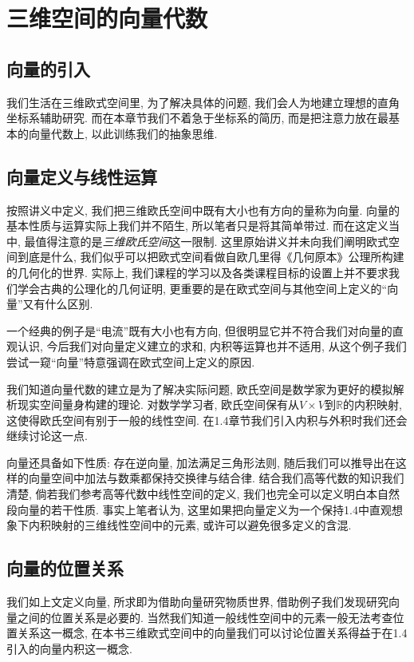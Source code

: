 \documentclass[./main.tex]{subfiles}
\begin{document}
\chapter{三维空间的向量代数}

\section{向量的引入}

我们生活在三维欧式空间里, 为了解决具体的问题, 我们会人为地建立理想的直角坐标系辅助研究. 而在本章节我们不着急于坐标系的简历, 而是把注意力放在最基本的向量代数上, 以此训练我们的抽象思维. 

\section{向量定义与线性运算}

按照讲义中定义, 我们把三维欧氏空间中既有大小也有方向的量称为向量. 向量的基本性质与运算实际上我们并不陌生, 所以笔者只是将其简单带过. 而在这定义当中, 最值得注意的是\textit{三维欧氏空间}这一限制. 这里原始讲义并未向我们阐明欧式空间到底是什么, 我们似乎可以把欧式空间看做自欧几里得《几何原本》公理所构建的几何化的世界. 实际上, 我们课程的学习以及各类课程目标的设置上并不要求我们学会古典的公理化的几何证明, 更重要的是在欧式空间与其他空间上定义的``向量''又有什么区别. 

一个经典的例子是``电流''既有大小也有方向, 但很明显它并不符合我们对向量的直观认识, 今后我们对向量定义建立的求和, 内积等运算也并不适用, 从这个例子我们尝试一窥``向量''特意强调在欧式空间上定义的原因. 

我们知道向量代数的建立是为了解决实际问题, 欧氏空间是数学家为更好的模拟解析现实空间量身构建的理论. 对数学学习者, 欧氏空间保有从\(V\times V\)到\(\mathbb{R}\)的内积映射, 这使得欧氏空间有别于一般的线性空间. 在1.4章节我们引入内积与外积时我们还会继续讨论这一点. 

向量还具备如下性质: 存在逆向量, 加法满足三角形法则, 随后我们可以推导出在这样的向量空间中加法与数乘都保持交换律与结合律. 结合我们高等代数的知识我们清楚, 倘若我们参考高等代数中线性空间的定义, 我们也完全可以定义明白本自然段向量的若干性质. 事实上笔者认为, 这里如果把向量定义为一个保持1.4中直观想象下内积映射的三维线性空间中的元素, 或许可以避免很多定义的含混. 

\section{向量的位置关系}

我们如上文定义向量, 所求即为借助向量研究物质世界, 借助例子我们发现研究向量之间的位置关系是必要的. 当然我们知道一般线性空间中的元素一般无法考查位置关系这一概念, 在本书三维欧式空间中的向量我们可以讨论位置关系得益于在1.4引入的向量内积这一概念. 
\end{document}
